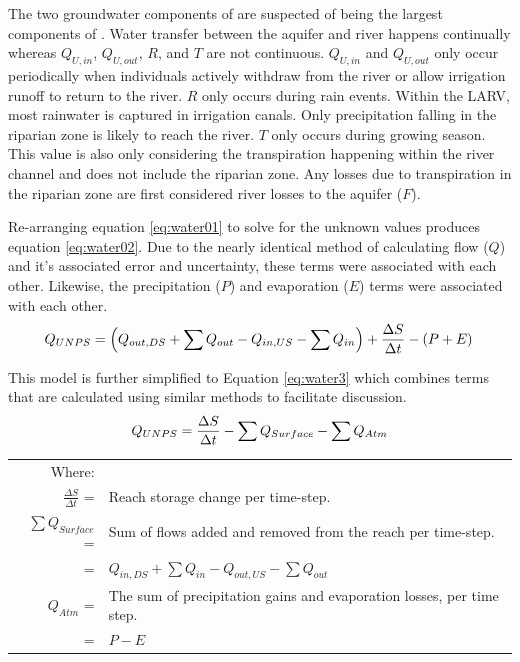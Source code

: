 \begin{linenumbers}
The two groundwater components of \Qnps are suspected of being the largest components of \Qnps.  Water transfer between the aquifer and river happens continually whereas $ Q_{U,in} $, $ Q_{U,out} $, $ R $, and $ T $ are not continuous.  $ Q_{U,in} $ and $ Q_{U,out} $ only occur periodically when individuals actively withdraw from the river or allow irrigation runoff to return to the river.  $ R $ only occurs during rain events.  Within the LARV, most rainwater is captured in irrigation canals.  Only precipitation falling in the riparian zone is likely to reach the river.  $ T $ only occurs during growing season.  This value is also only considering the transpiration happening within the river channel and does not include the riparian zone.  Any losses due to transpiration in the riparian zone are first considered river losses to the aquifer ($ F $).

Re-arranging equation \eqref{eq:water01} to solve for the unknown values produces equation \ref{eq:water02}.  Due to the nearly identical method of calculating flow ($ Q $) and it's associated error and uncertainty, these terms were associated with each other.  Likewise, the precipitation ($ P $) and evaporation ($ E $) terms were associated with each other.
\begin{equation}
	\label{eq:water02}
	Q_{UNPS} = \left( Q_{out,DS} + \sum Q_{out} - Q_{in,US} - \sum Q_{in} \right) + \frac{\Delta S}{\Delta t} - \left( P + E \right)\\ 
\end{equation}

This model is further simplified to Equation \ref{eq:water3} which combines terms that are calculated using similar methods to facilitate discussion.
\begin{equation}
	\label{eq:water3}
	Q_{UNPS} = \frac{\Delta S}{\Delta t} - \sum Q_{Surface} - \sum Q_{Atm}\\ 
\end{equation}
\begin{tabular}{r p{5.5in}}
	Where:&\\
	$ \displaystyle \frac{\Delta S}{\Delta t} $ = & Reach storage change per time-step.\\
	$ \displaystyle \sum Q_{Surface} $ = & Sum of flows added and removed from the reach per time-step. \\
		= & $ Q_{in,DS} + \sum Q_{in} - Q_{out,US} - \sum Q_{out} $\\
	$ Q_{Atm} $ = & The sum of precipitation gains and evaporation losses, per time step.\\
		= & $ P - E $\\
\end{tabular}\\


\end{linenumbers}
